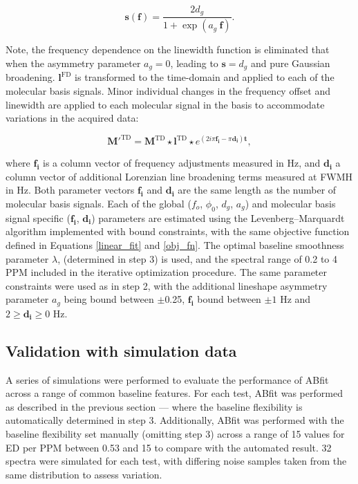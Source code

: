 \documentclass[num-refs]{wiley-article}
\begin{document}
\begin{equation}
  \mathbf{s}(\mathbf{f}) = \frac{2 d_{g}}{1 + \exp(a_{g} \ \mathbf{f})}.
\end{equation}

Note, the frequency dependence on the linewidth function is eliminated that when the asymmetry parameter $a_{g}=0$, leading to $\mathbf{s}=d_{g}$ and pure Gaussian broadening. $\mathbf{l}^{\mathrm{FD}}$ is transformed to the time-domain and applied to each of the molecular basis signals. Minor individual changes in the frequency offset and linewidth are applied to each molecular signal in the basis to accommodate variations in the acquired data:

\begin{equation}
  \mathbf{M}'^{\mathrm{TD}} = \mathbf{M}^{\mathrm{TD}} \star \mathbf{l}^{\mathrm{TD}} \star e^{(2i \pi \mathbf{f_{i}} - \pi \mathbf{d_{i}} ) \mathbf{t}},
\end{equation}

where $\mathbf{f_{i}}$ is a column vector of frequency adjustments measured in Hz, and $\mathbf{d_{i}}$ a column vector of additional Lorenzian line broadening terms measured at FWMH in Hz. Both parameter vectors $\mathbf{f_{i}}$ and $\mathbf{d_{i}}$ are the same length as the number of molecular basis signals. Each of the global ($f_{o}$, $\phi_{0}$, $d_{g}$, $a_{g}$) and molecular basis signal specific ($\mathbf{f_{i}}$, $\mathbf{d_{i}}$) parameters are estimated using the Levenberg–Marquardt algorithm \cite{Levenberg1944} implemented with bound constraints, with the same objective function defined in Equations \ref{linear_fit} and \ref{obj_fn}. The optimal baseline smoothness parameter $\lambda$, (determined in step 3) is used, and the spectral range of 0.2 to 4 PPM included in the iterative optimization procedure. The same parameter constraints were used as in step 2, with the additional lineshape asymmetry parameter $a_{g}$ being bound between $\pm$0.25, $\mathbf{f_{i}}$ bound between $\pm1$ Hz and  $2 \geq \mathbf{d_{i}} \geq 0$ Hz.

\subsection{Validation with simulation data}
A series of simulations were performed to evaluate the performance of ABfit across a range of common baseline features. For each test, ABfit was performed as described in the previous section --- where the baseline flexibility is automatically determined in step 3. Additionally, ABfit was performed with the baseline flexibility set manually (omitting step 3) across a range of 15 values for ED per PPM between 0.53 and 15 to compare with the automated result. 32 spectra were simulated for each test, with differing noise samples taken from the same distribution to assess variation.
\end{document}
